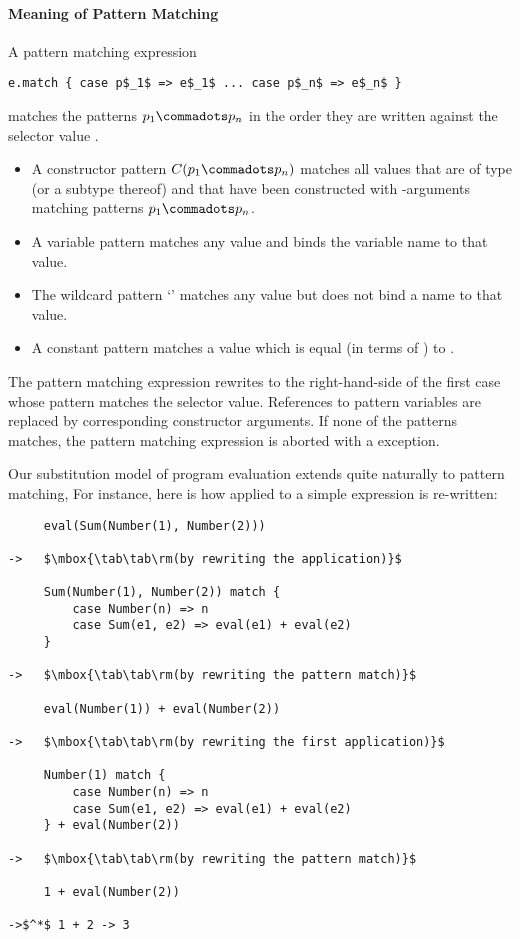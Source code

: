 \documentclass[a4paper,12pt,twoside,titlepage]{book}
\begin{document}
\paragraph{Meaning of Pattern Matching}
A pattern matching expression 
\begin{lstlisting}
e.match { case p$_1$ => e$_1$ ... case p$_n$ => e$_n$ }
\end{lstlisting}
matches the patterns $p_1 \commadots p_n$ in the order they
are written against the selector value .
\begin{itemize}
\item
A constructor pattern $C(p_1 \commadots p_n)$ matches all values that
are of type  (or a subtype thereof) and that have been constructed with 
-arguments matching patterns $p_1 \commadots p_n$.
\item 
A variable pattern  matches any value and binds the variable
name to that value.  
\item 
The wildcard pattern `\code{_}' matches any value but does not bind a name to that value. 
\item A constant pattern  matches a value which is
equal (in terms of \code{==}) to .
\end{itemize}
The pattern matching expression rewrites to the right-hand-side of the
first case whose pattern matches the selector value. References to
pattern variables are replaced by corresponding constructor arguments.
If none of the patterns matches, the pattern matching expression is
aborted with a  exception.

\example Our substitution model of program evaluation extends quite naturally to pattern matching, For instance, here is how  applied to a simple expression is re-written:
\begin{lstlisting}
     eval(Sum(Number(1), Number(2)))

->   $\mbox{\tab\tab\rm(by rewriting the application)}$

     Sum(Number(1), Number(2)) match {
         case Number(n) => n
         case Sum(e1, e2) => eval(e1) + eval(e2)
     }

->   $\mbox{\tab\tab\rm(by rewriting the pattern match)}$

     eval(Number(1)) + eval(Number(2))

->   $\mbox{\tab\tab\rm(by rewriting the first application)}$

     Number(1) match {
         case Number(n) => n
         case Sum(e1, e2) => eval(e1) + eval(e2)
     } + eval(Number(2))

->   $\mbox{\tab\tab\rm(by rewriting the pattern match)}$

     1 + eval(Number(2))

->$^*$ 1 + 2 -> 3
\end{lstlisting}
\end{document}
